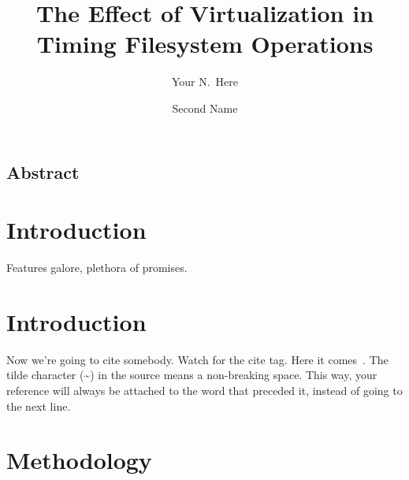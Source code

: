 \documentclass[letterpaper,twocolumn,10pt]{article}
\begin{document}
\date{}

\title{\Large \bf The Effect of Virtualization in Timing Filesystem Operations}

\author{
{\rm Your N.\ Here}\\
\and
{\rm Second Name}\\
} %

\maketitle

\thispagestyle{empty}


\subsection*{Abstract}

\section{Introduction}

Features galore, plethora of promises.\\

\section{Introduction}

Now we're going to cite somebody.  Watch for the cite tag.
Here it comes~\cite{Chaum1981,Diffie1976}.  The tilde character (\~{})
in the source means a non-breaking space.  This way, your reference will
always be attached to the word that preceded it, instead of going to the
next line.

\section{Methodology}
\end{document}
